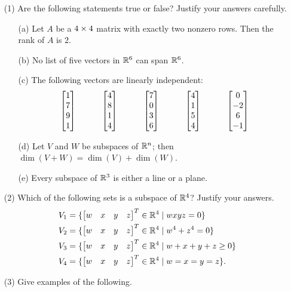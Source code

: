 \documentclass[a4paper]{article}
\begin{document}
\begin{problem}[2011-12 resit]
 \begin{itemize}
  \item[(1)]
   Are the following statements true or false?  Justify your answers
   carefully. 
   \begin{itemize}
    \item[(a)] Let $A$ be a $4\times 4$ matrix with exactly two nonzero
     rows.  Then the rank of $A$ is $2$.
    \item[(b)] No list of five vectors in ${\mathbb{R}}^6$ can span ${\mathbb{R}}^6$.
    \item[(c)] The following vectors are linearly independent:
     \[ \left[\begin{matrix} 1\\ 7\\ 9\\ 1 \end{matrix}\right] \hspace{3em}
        \left[\begin{matrix} 4\\ 8\\ 1\\ 4 \end{matrix}\right] \hspace{3em}
        \left[\begin{matrix} 7\\ 0\\ 3\\ 6 \end{matrix}\right] \hspace{3em}
        \left[\begin{matrix} 4\\ 1\\ 5\\ 4 \end{matrix}\right] \hspace{3em}
        \left[\begin{matrix} 0\\-2\\ 6\\-1 \end{matrix}\right]
     \]
    \item[(d)] Let $V$ and $W$ be subspaces of ${\mathbb{R}}^n$; then
     $\dim(V+W)=\dim(V)+\dim(W)$. 
    \item[(e)] Every subspace of ${\mathbb{R}}^3$ is either a line or a plane.
   \end{itemize}
  \item[(2)]
   Which of the following sets is a subspace of ${\mathbb{R}}^4$?  Justify your
   answers. 
   \begin{align*}
    V_1 &= \{\left[\begin{matrix} w&x&y&z\end{matrix}\right]^T \in{\mathbb{R}}^4 \;|\; wxyz=0\} \\
    V_2 &= \{\left[\begin{matrix} w&x&y&z\end{matrix}\right]^T \in{\mathbb{R}}^4 \;|\; w^4+z^4=0\} \\
    V_3 &= \{\left[\begin{matrix} w&x&y&z\end{matrix}\right]^T \in{\mathbb{R}}^4 \;|\; w+x+y+z\geq 0\} \\
    V_4 &= \{\left[\begin{matrix} w&x&y&z\end{matrix}\right]^T \in{\mathbb{R}}^4 \;|\; w=x=y=z\}.
   \end{align*}
  \item[(3)] Give examples of the following. 

\end{itemize}
\end{problem}
\end{document}
